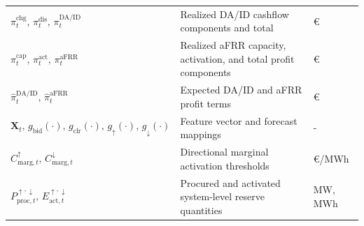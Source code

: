 \begin{longtable}{@{}>{\raggedright\arraybackslash}p{} >{\raggedright\arraybackslash}p{} >{\raggedright\arraybackslash}p{}@{}}
    $\pi_t^{\text{chg}},\,\pi_t^{\text{dis}},\,\pi_t^{\text{DA/ID}}$                                                                                                                                                                                                                                          & Realized DA/ID cashflow components and total                                                                                       & €                                   \\
    $\pi_t^{\text{cap}},\,\pi_t^{\text{act}},\,\pi_t^{\text{aFRR}}$                                                                                                                                                                                                                                           & Realized aFRR capacity, activation, and total profit components                                                                    & €                                   \\
    $\hat{\pi}_t^{\text{DA/ID}},\,\hat{\pi}_t^{\text{aFRR}}$                                                                                                                                                                                                                                                  & Expected DA/ID and aFRR profit terms                                                                                               & €                                   \\
    $\mathbf{X}_t,\,g_{\text{bid}}(\cdot),\,g_{\text{clr}}(\cdot),\,g_{\uparrow}(\cdot),\,g_{\downarrow}(\cdot)$                                                                                                                                                                                              & Feature vector and forecast mappings                                                                                               & -                                   \\
    $C_{\text{marg},t}^{\uparrow},\,C_{\text{marg},t}^{\downarrow}$                                                                                                                                                                                                                                           & Directional marginal activation thresholds                                                                                         & €/MWh                               \\
    $P_{\text{proc},t}^{\uparrow,\downarrow},\,E_{\text{act},t}^{\uparrow,\downarrow}$                                                                                                                                                                                                                        & Procured and activated system-level reserve quantities                                                                             & MW, MWh                             \\

\end{longtable}
